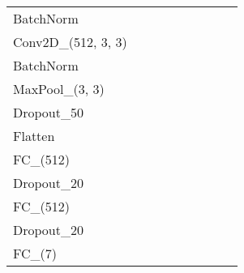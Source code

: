 \begin{table}[!htb]
{\begin{tabular}{@{}lllllllll@{}}
BatchNorm             &                       &                       &                       &                       &                       &                       &                       &                       \\
Conv2D\_(512, 3, 3)   &                       &                       &                       &                       &                       &                       &                       &                       \\
BatchNorm             &                       &                       &                       &                       &                       &                       &                       &                       \\
MaxPool\_(3, 3)       &                       &                       &                       &                       &                       &                       &                       &                       \\
Dropout\_50           &                       &                       &                       &                       &                       &                       &                       &                       \\
Flatten               &                       &                       &                       &                       &                       &                       &                       &                       \\
FC\_(512)             &                       &                       &                       &                       &                       &                       &                       &                       \\
Dropout\_20           &                       &                       &                       &                       &                       &                       &                       &                       \\
FC\_(512)             &                       &                       &                       &                       &                       &                       &                       &                       \\
Dropout\_20           &                       &                       &                       &                       &                       &                       &                       &                       \\
FC\_(7)               &                       &                       &                       &                       &                       &                       &                       &                       \\ \bottomrule
\end{tabular}%
}
\end{table}